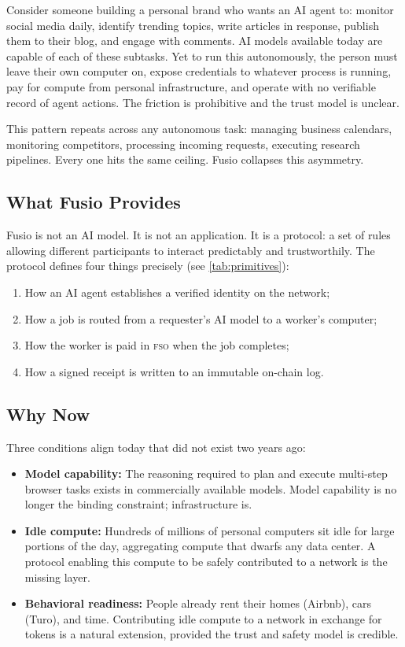\documentclass[10pt,twocolumn]{article}
\newcommand{\fso}{\textsc{fso}}
\begin{document}
Consider someone building a personal brand who wants an AI agent to: monitor social media
daily, identify trending topics, write articles in response, publish them to their blog, and
engage with comments. AI models available today are capable of each of these subtasks. Yet
to run this autonomously, the person must leave their own computer on, expose credentials
to whatever process is running, pay for compute from personal infrastructure, and operate
with no verifiable record of agent actions. The friction is prohibitive and the trust model is
unclear.

This pattern repeats across any autonomous task: managing business calendars, monitoring
competitors, processing incoming requests, executing research pipelines. Every one hits the
same ceiling. Fusio collapses this asymmetry.

\subsection{What Fusio Provides}

Fusio is not an AI model. It is not an application. It is a protocol: a set of rules allowing
different participants to interact predictably and trustworthily. The protocol defines four
things precisely (see \cref{tab:primitives}):
\begin{enumerate}[noitemsep,leftmargin=*,topsep=2pt]
  \item How an AI agent establishes a verified identity on the network;
  \item How a job is routed from a requester's AI model to a worker's computer;
  \item How the worker is paid in \fso{} when the job completes;
  \item How a signed receipt is written to an immutable on-chain log.
\end{enumerate}

\subsection{Why Now}

Three conditions align today that did not exist two years ago:
\begin{itemize}[noitemsep,leftmargin=*,topsep=2pt]
  \item \textbf{Model capability:} The reasoning required to plan and execute multi-step browser tasks exists in commercially available models. Model capability is no longer the binding constraint; infrastructure is.
  \item \textbf{Idle compute:} Hundreds of millions of personal computers sit idle for large portions of the day, aggregating compute that dwarfs any data center. A protocol enabling this compute to be safely contributed to a network is the missing layer.
  \item \textbf{Behavioral readiness:} People already rent their homes (Airbnb), cars (Turo), and time. Contributing idle compute to a network in exchange for tokens is a natural extension, provided the trust and safety model is credible.
\end{itemize}
\end{document}
